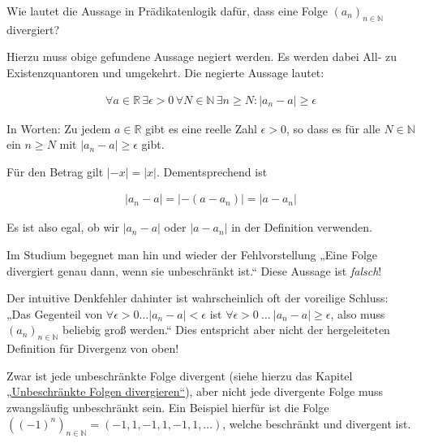 \documentclass[fontsize=9pt,
               parskip=half-,
               DIV=14,
               listof=chapterentry,
               tocflat]{scrbook}
\begin{document}
\begin{mdframed}[style=semanticbox,frametitleaboveskip=3pt,innerbottommargin=3pt,frametitle=Frage]
Wie lautet die Aussage in Prädikatenlogik dafür, dass eine Folge $(a_{n})_{n\in \mathbb {N} }$ divergiert?

\end{mdframed}

\begin{answer*}
Hierzu muss obige gefundene Aussage negiert werden.  Es werden dabei All- zu Existenzquantoren und umgekehrt. Die negierte Aussage lautet:

\begin{align*}
\forall a\in \mathbb {R} \,\exists \epsilon >0\,\forall N\in \mathbb {N} \,\exists n\geq N:|a_{n}-a|\geq \epsilon 
\end{align*}

In Worten: Zu jedem $a\in \mathbb {R} $ gibt es eine reelle Zahl $\epsilon >0$, so dass es für alle $N\in \mathbb {N} $ ein $n\geq N$ mit $|a_{n}-a|\geq \epsilon $ gibt.

\end{answer*}

\begin{hint*}
Für den Betrag gilt $|-x|=|x|$. Dementsprechend ist

\begin{align*}
|a_{n}-a|=|-(a-a_{n})|=|a-a_{n}|
\end{align*}

Es ist also egal, ob wir $|a_{n}-a|$ oder $|a-a_{n}|$ in der Definition verwenden.

\end{hint*}

\begin{warning*}
Im Studium begegnet man hin und wieder der Fehlvorstellung „Eine Folge divergiert genau dann, wenn sie unbeschränkt ist.“ Diese Aussage ist \emph{falsch}!

Der intuitive Denkfehler dahinter ist wahrscheinlich oft der voreilige Schluss: „Das Gegenteil von $\forall \epsilon >0\ldots |a_{n}-a|<\epsilon $ ist $\forall \epsilon >0\ \ldots \ |a_{n}-a|\geq \epsilon $, also muss $(a_{n})_{n\in \mathbb {N} }$ beliebig groß werden.“ Dies entspricht aber nicht der hergeleiteten Definition für Divergenz von oben!

Zwar ist jede unbeschränkte Folge divergent (siehe hierzu das Kapitel \href{https://de.wikibooks.org/wiki/Mathe\_für\_Nicht-Freaks:\_Unbeschränkte\_Folgen\_divergieren}
{„Unbeschränkte Folgen divergieren“}), aber nicht jede divergente Folge muss zwangsläufig unbeschränkt sein. Ein Beispiel hierfür ist die Folge $\left((-1)^{n}\right)_{n\in \mathbb {N} }=(-1,1,-1,1,-1,1,\ldots )$, welche beschränkt und divergent ist.

\end{warning*}
\end{document}
